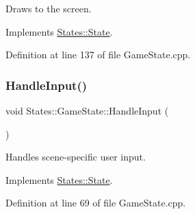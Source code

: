 Draws to the screen. 

\begin{DoxyVerb}\end{DoxyVerb}
 

Implements \mbox{\hyperlink{class_states_1_1_state_af5faf0a12478e595ec488fa6108fa490}{States\+::\+State}}.



Definition at line 137 of file Game\+State.\+cpp.


\begin{DoxyCode}{0}

\end{DoxyCode}
\mbox{\label{class_states_1_1_game_state_a6521d6d97ac2fb388085a70abce704a9}} 
\subsubsection{\texorpdfstring{HandleInput()}{HandleInput()}}
{\footnotesize\ttfamily void States\+::\+Game\+State\+::\+Handle\+Input (\begin{DoxyParamCaption}{ }\end{DoxyParamCaption})\hspace{0.3cm}{\ttfamily [virtual]}}



Handles scene-\/specific user input. 

\begin{DoxyVerb}\end{DoxyVerb}
 

Implements \mbox{\hyperlink{class_states_1_1_state_a9f5a1461456ad43c936808c9cfb9e8bd}{States\+::\+State}}.



Definition at line 69 of file Game\+State.\+cpp.


